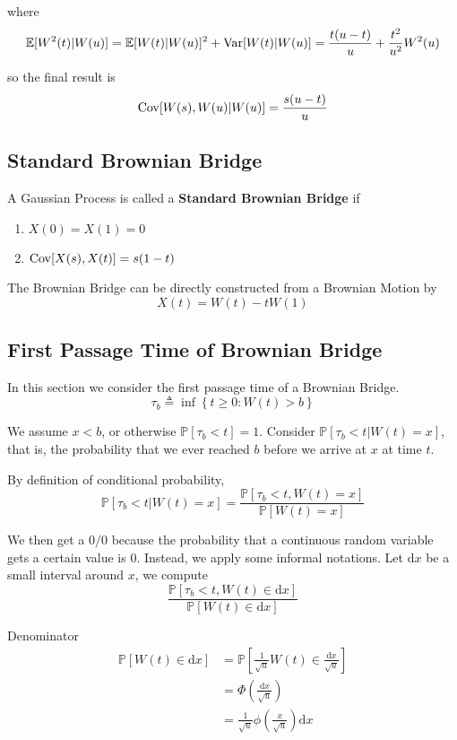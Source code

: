         where
        \[ \mathbb{E}[W^2(t)|W(u)] = \mathbb{E}[W(t)|W(u)]^2 + \mathrm{Var}[W(t)|W(u)] = \frac{t(u-t)}{u} + \frac{t^2}{u^2}W^2(u) \]

        so the final result is
        \[ \mathrm{Cov}[W(s), W(u) | W(u)] = \frac{s(u-t)}{u} \]

    \subsection{Standard Brownian Bridge}
        \begin{definition}\label{def:BrownianBridgeStd}
            A Gaussian Process is called a \textbf{Standard Brownian Bridge} if
            \begin{enumerate}
                \item $X(0) = X(1) = 0$
                \item $\mathrm{Cov}[X(s), X(t)] = s(1-t)$
            \end{enumerate}
        \end{definition}
        \begin{remark}
            The Brownian Bridge can be directly constructed from a Brownian Motion by
            \[ X(t) = W(t) - tW(1) \]
        \end{remark}

    \subsection{First Passage Time of Brownian Bridge}
        In this section we consider the first passage time of a Brownian Bridge.
        \[ \tau_b \triangleq \inf\left\{ t \ge 0 : W(t) > b \right\} \]

        We assume $x < b$, or otherwise $\mathbb{P}[\tau_b < t] = 1$. Consider $\mathbb{P}[\tau_b < t | W(t) = x]$, that is, the probability that we ever reached $b$ before we arrive at $x$ at time $t$.

        By definition of conditional probability,
        \[ \mathbb{P}[\tau_b < t | W(t) =  x] = \frac{\mathbb{P}[\tau_b < t, W(t) = x]}{\mathbb{P}[W(t) = x]} \]

        We then get a $0/0$ because the probability that a continuous random variable gets a certain value is 0. Instead, we apply some informal notations. Let $\mathrm{d}x$ be a small interval around $x$, we compute
        \[ \frac{\mathbb{P}[\tau_b < t, W(t) \in \mathrm{d}x]}{\mathbb{P}[W(t) \in \mathrm{d}x]} \]

        Denominator
        \begin{align*}
            \mathbb{P}[W(t) \in \mathrm{d}x] &= \mathbb{P}[\frac{1}{\sqrt{u}}W(t) \in \frac{\mathrm{d}x}{\sqrt{u}}]\\
            &= \Phi(\frac{\mathrm{d}x}{\sqrt{u}})\\
            &= \frac{1}{\sqrt{u}}\phi(\frac{x}{\sqrt{u}})\mathrm{d}x
        \end{align*}


